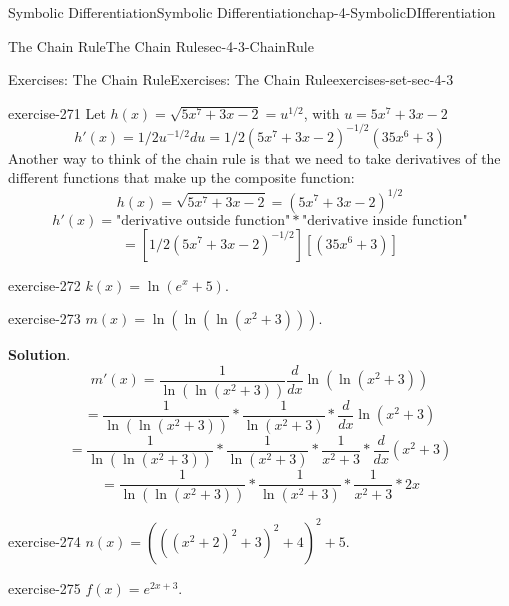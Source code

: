 \documentclass[oneside,10pt,]{book}
\numberwithin{equation}{section}
\begin{document}
\begin{chapterptx}{Symbolic Differentiation}{}{Symbolic Differentiation}{}{}{chap-4-SymbolicDIfferentiation}
\begin{sectionptx}{The Chain Rule}{}{The Chain Rule}{}{}{sec-4-3-ChainRule}
\begin{exercises-subsection-numberless}{Exercises: The Chain Rule}{}{Exercises: The Chain Rule}{}{}{exercises-set-sec-4-3}
\begin{divisionexercise}{3}{}{}{exercise-271}
\hypertarget{p-1665}{}%
Let  \(h(x)=\sqrt{5x^7+3x-2}=u^{1/2}\), with \(u= 5x^7+3x-2\)%
%
\begin{equation*}
h'(x)=1/2 u^{-1/2} du=1/2  (5x^7+3x-2)^{-1/2}  (35x^6+3)
\end{equation*}
\hypertarget{p-1666}{}%
Another way to think of the chain rule is that we need to take derivatives of the different functions that make up the composite function:%
%
\begin{equation*}
h(x)=\sqrt{5x^7+3x-2}=(5x^7+3x-2)^{1/2}
\end{equation*}
%
\begin{equation*}
h'(x)=\text{"derivative outside function"}*\text{"derivative inside function"}
\end{equation*}
%
\begin{equation*}
=[1/2  (5x^7+3x-2)^{-1/2}  ][(35x^6+3)]
\end{equation*}
\end{divisionexercise}%
\begin{divisionexercise}{4}{}{}{exercise-272}%
\hypertarget{p-1667}{}%
\(k(x)=\ln(e^x+5)\).%
\end{divisionexercise}%
\begin{divisionexercise}{5}{}{}{exercise-273}%
\hypertarget{p-1668}{}%
\(m(x)=\ln(\ln(\ln(x^2+3)))\).%
\par\smallskip%
\noindent\textbf{Solution}.\hypertarget{solution-136}{}\quad%
%
\begin{equation*}
m'(x)=\frac{1}{\ln(\ln(x^2+3))} \frac{d}{dx} \ln(\ln(x^2+3) )
\end{equation*}
%
\begin{equation*}
=\frac{1}{\ln(\ln(x^2+3))}* \frac{1}{\ln(x^2+3)}*\frac{d}{dx}  \ln(x^2+3)
\end{equation*}
%
\begin{equation*}
=\frac{1}{\ln(\ln(x^2+3))}* \frac{1}{\ln(x^2+3)}*\frac{1}{x^2+3}*\frac{d}{dx}  (x^2+3)
\end{equation*}
%
\begin{equation*}
=\frac{1}{\ln(\ln(x^2+3))}* \frac{1}{\ln(x^2+3)}*\frac{1}{x^2+3}*2x
\end{equation*}
\end{divisionexercise}%
\begin{divisionexercise}{6}{}{}{exercise-274}%
\hypertarget{p-1669}{}%
\(n(x)=(((x^2+2)^2+3)^2+4)^2+5\).%
\end{divisionexercise}%
\begin{divisionexercise}{7}{}{}{exercise-275}%
\hypertarget{p-1670}{}%
\(f(x)=e^{2x+3}\).%

\end{divisionexercise}
\end{exercises-subsection-numberless}
\end{sectionptx}
\end{chapterptx}
\end{document}
